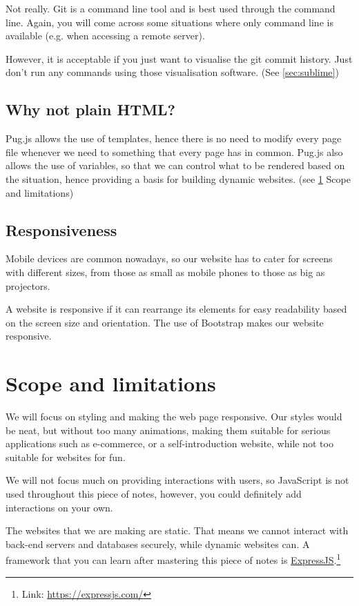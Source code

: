 Not really. Git is a command line tool and is best used through the command line. Again, you will come across some situations where only command line is available (e.g. when accessing a remote server). 

However, it is acceptable if you just want to visualise the git commit history. Just don't run any commands using those visualisation software. (See \cref{sec:sublime})

\subsection*{Why not plain HTML?}

Pug.js allows the use of templates, hence there is no need to modify every page file whenever we need to something that every page has in common. Pug.js also allows the use of variables, so that we can control what to be rendered based on the situation, hence providing a basis for building dynamic websites. (see \cref{sec:limitations} Scope and limitations)

\subsection*{Responsiveness}

Mobile devices are common nowadays, so our website has to cater for screens with different sizes, from those as small as mobile phones to those as big as projectors. 

A website is responsive if it can rearrange its elements for easy readability based on the screen size and orientation. The use of Bootstrap makes our website responsive.

\section{Scope and limitations}
\label{sec:limitations}
We will focus on styling and making the web page responsive. Our styles would be neat, but without too many animations, making them suitable for serious applications such as e-commerce, or a self-introduction website, while not too suitable for websites for fun.

We will not focus much on providing interactions with users, so JavaScript is not used throughout this piece of notes, however, you could definitely add interactions on your own.

The websites that we are making are static. That means we cannot interact with back-end servers and databases securely, while dynamic websites can. A framework that you can learn after mastering this piece of notes is \href{https://expressjs.com/}{ExpressJS}.\footnote{Link: \url{https://expressjs.com/}}

